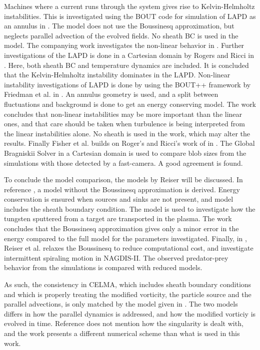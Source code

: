 Machines where a current runs through the system gives rise to Kelvin-Helmholtz instabilities.
This is investigated using the BOUT code for simulation of LAPD as an annulus in \cite{Popovich2010a}.
The model does not use the Boussinesq approximation, but neglects parallel advection of the evolved fields.
No sheath BC is used in the model.
The companying work investigates the non-linear behavior in \cite{Popovich2010}.
Further investigations of the LAPD is done in a Cartesian domain by Rogers and Ricci in \cite{Rogers2010}.
Here, both sheath BC and temperature dynamics are included.
It is concluded that the Kelvin-Helmholtz instability dominates in the LAPD.
Non-linear instability investigations of LAPD is done by using the BOUT++ framework by Friedman et al. in \cite{Friedman2012}.
An annulus geometry is used, and a split between fluctuations and background is done to get an energy conserving model.
The work concludes that non-linear instabilities may be more important than the linear ones, and that care should be taken when turbulence is being interpreted from the linear instabilities alone.
No sheath is used in the work, which may alter the results.
Finally Fisher et al.  builds on Roger's and Ricci's work of \cite{Rogers2010} in \cite{Fisher2015}.
The Global Bragniskii Solver in a Cartesian domain is used to compare blob sizes from the simulations with those detected by a fast-camera. A good agreement is found.

To conclude the model comparison, the models by Reiser will be discussed.
In reference \cite{Reiser2012}, a model without the Boussinesq approximation is derived.
Energy conservation is ensured when sources and sinks are not present, and model includes the sheath boundary condition.
The model is used to investigate how the tungsten sputtered from a target are transported in the plasma.
The work concludes that the Boussinesq approximation gives only a minor error in the energy compared to the full model for the parameters investigated.
Finally, in \cite{Reiser2014}, Reiser et al. relaxes the Boussinesq to reduce computational cost, and investigate intermittent spiraling motion in NAGDIS-II.
The observed predator-prey behavior from the simulations is compared with reduced models.

As such, the consistency in CELMA, which includes sheath boundary conditions and which is properly treating the modified vorticity, the particle source and the parallel advections, is only matched by the model given in \cite{Reiser2012}.
The two models differs in how the parallel dynamics is addressed, and how the modified vorticiy is evolved in time.
Reference \cite{Reiser2012} does not mention how the singularity is dealt with, and the work presents a different numerical scheme than what is used in this work.
